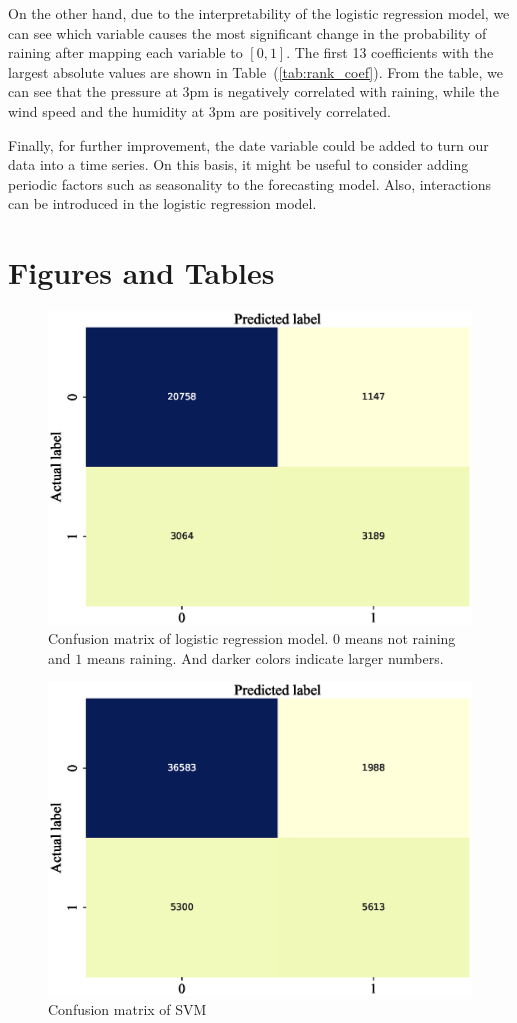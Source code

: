 \documentclass[11pt, a4paper, jou]{apa7}
\begin{document}
On the other hand, due to the interpretability of the logistic regression model, we can see which variable causes the most significant change in the probability of raining after mapping each variable to $[0,1]$. The first 13 coefficients with the largest absolute values are shown in Table~(\ref{tab:rank_coef}). From the table, we can see that the pressure at 3pm is negatively correlated with raining, while the wind speed and the humidity at 3pm are positively correlated. 

Finally, for further improvement, the date variable could be added to turn our data into a time series. On this basis, it might be useful to consider adding periodic factors such as seasonality to the forecasting model. Also, interactions can be introduced in the logistic regression model. 

\printbibliography 
\clearpage
\appendix
\section{Figures and Tables}
\begin{figure}[h]
    \centering
    \caption{Confusion matrix of logistic regression model. $0$ means not raining and $1$ means raining. And darker colors indicate larger numbers. }\label{fig:logistic_confusion}
    \includegraphics[width=.45\textwidth]{figures/Logit_confusion_matrix.eps}
\end{figure}

\begin{figure}[h]
    \centering
    \caption{Confusion matrix of SVM}\label{fig:SVM_confusion}
    \includegraphics[width=.45\textwidth]{figures/SVM_confusion_matrix.eps}
\end{figure}
\end{document}
